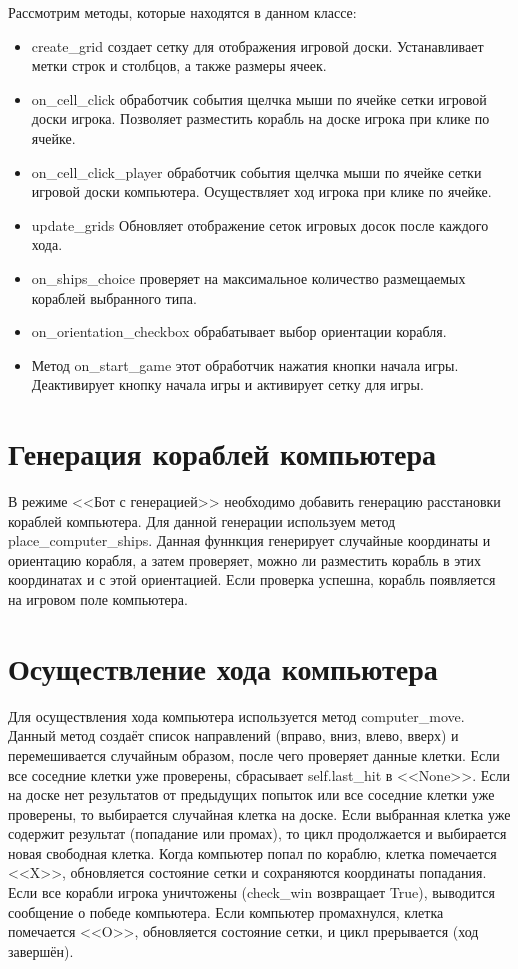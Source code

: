 Рассмотрим методы, которые находятся в данном классе:
\begin{itemize}
    \item create\_grid создает сетку для отображения игровой доски. Устанавливает метки строк и столбцов, а также размеры ячеек.
    \item on\_cell\_click обработчик события щелчка мыши по ячейке сетки игровой доски игрока. Позволяет разместить корабль на доске игрока при клике по ячейке.
    \item on\_cell\_click\_player обработчик события щелчка мыши по ячейке сетки игровой доски компьютера. Осуществляет ход игрока при клике по ячейке.
    \item update\_grids Обновляет отображение сеток игровых досок после каждого хода.
    \item on\_ships\_choice проверяет на максимальное количество размещаемых кораблей выбранного типа.
    \item on\_orientation\_checkbox обрабатывает выбор ориентации корабля.
    \item Метод on\_start\_game этот обработчик нажатия кнопки начала игры. Деактивирует кнопку начала игры и активирует сетку для игры.
\end{itemize}
\section{\label{sec:ch02/sec06}Генерация кораблей компьютера}
В режиме <<Бот с генерацией>> необходимо добавить генерацию расстановки кораблей компьютера. Для данной генерации используем метод place\_computer\_ships. Данная фуннкция генерирует случайные координаты и ориентацию корабля, а затем проверяет, можно ли разместить корабль в этих координатах и с этой ориентацией. Если проверка успешна, корабль появляется на игровом поле компьютера.
\section{\label{sec:ch02/sec07}Осуществление хода компьютера}
Для осуществления хода компьютера используется метод computer\_move. Данный метод создаёт список направлений (вправо, вниз, влево, вверх) и перемешивается случайным образом, после чего проверяет данные клетки. Если все соседние клетки уже проверены, сбрасывает self.last\_hit в <<None>>. Если на доске нет результатов от предыдущих попыток или все соседние клетки уже проверены, то выбирается случайная клетка на доске. Если выбранная клетка уже содержит результат (попадание или промах), то цикл продолжается и выбирается новая свободная клетка. Когда компьютер попал по кораблю, клетка помечается <<X>>, обновляется состояние сетки и сохраняются координаты попадания. Если все корабли игрока уничтожены (check\_win возвращает True), выводится сообщение о победе компьютера. Если компьютер промахнулся, клетка помечается <<O>>, обновляется состояние сетки, и цикл прерывается (ход завершён).
